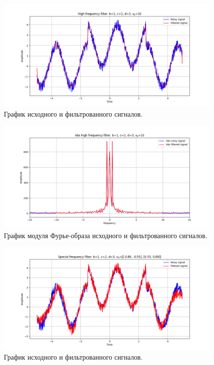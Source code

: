 \documentclass[a4paper, 12pt]{article}
\begin{document}
    \begin{figure}[!htb]
        \centering
        \includegraphics[scale=0.485]{6_u_flt_u_nospec.png}
        \captionsetup{skip=0pt}
        \caption{График исходного и фильтрованного сигналов.}
        \label{fig:fig99}
    \end{figure}
    \begin{figure}[!htb]
        \centering
        \includegraphics[scale=0.485]{6_abs_u_U_nospec.png}
        \captionsetup{skip=0pt}
        \caption{График модуля Фурье-образа исходного и фильтрованного сигналов.}
        \label{fig:fig100}
    \end{figure}
    \begin{figure}[!htb]
        \centering
        \includegraphics[scale=0.485]{6_1_u_flt_u_nospec.png}
        \captionsetup{skip=0pt}
        \caption{График исходного и фильтрованного сигналов.}
        \label{fig:fig101}
    \end{figure}
\end{document}
